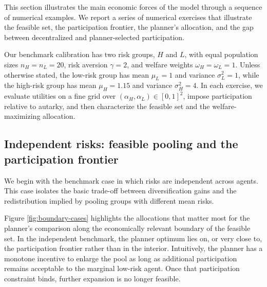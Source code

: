 \documentclass[a4paper,12pt]{article}
\theoremstyle{definition}
\theoremstyle{remark}
\newcommand{\1}{\mathbf{1}}
\begin{document}
This section illustrates the main economic forces of the model through a sequence of numerical examples. We report a series of numerical exercises that illustrate the feasible set, the participation frontier, the planner's allocation, and the gap between decentralized and planner-selected participation.

Our benchmark calibration has two risk groups, \(H\) and \(L\), with equal population sizes \(n_H=n_L=20\), risk aversion \(\gamma=2\), and welfare weights \(\omega_H=\omega_L=1\). Unless otherwise stated, the low-risk group has mean \(\mu_L=1\) and variance \(\sigma_L^2=1\), while the high-risk group has mean \(\mu_H=1.15\) and variance \(\sigma_H^2=4\). In each exercise, we evaluate utilities on a fine grid over \((\alpha_H,\alpha_L)\in[0,1]^2\), impose participation relative to autarky, and then characterize the feasible set and the welfare-maximizing allocation.

\subsection{Independent risks: feasible pooling and the participation frontier}

We begin with the benchmark case in which risks are independent across agents. This case isolates the basic trade-off between diversification gains and the redistribution implied by pooling groups with different mean risks.

Figure \ref{fig:boundary-cases} highlights the allocations that matter most for the planner's comparison along the economically relevant boundary of the feasible set. In the independent benchmark, the planner optimum lies on, or very close to, the participation frontier rather than in the interior. Intuitively, the planner has a monotone incentive to enlarge the pool as long as additional participation remains acceptable to the marginal low-risk agent. Once that participation constraint binds, further expansion is no longer feasible.
\end{document}
